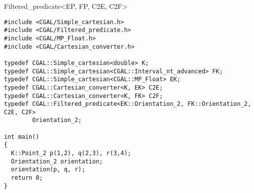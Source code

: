 \begin{ccRefClass}{Filtered_predicate<EP, FP, C2E, C2F>}
\begin{verbatim}
#include <CGAL/Simple_cartesian.h>
#include <CGAL/Filtered_predicate.h>
#include <CGAL/MP_Float.h>
#include <CGAL/Cartesian_converter.h>

typedef CGAL::Simple_cartesian<double> K;
typedef CGAL::Simple_cartesian<CGAL::Interval_nt_advanced> FK;
typedef CGAL::Simple_cartesian<CGAL::MP_Float> EK;
typedef CGAL::Cartesian_converter<K, EK> C2E;
typedef CGAL::Cartesian_converter<K, FK> C2F;
typedef CGAL::Filtered_predicate<EK::Orientation_2, FK::Orientation_2, C2E, C2F>
        Orientation_2;

int main()
{
  K::Point_2 p(1,2), q(2,3), r(3,4);
  Orientation_2 orientation;
  orientation(p, q, r);
  return 0;
}
\end{verbatim}

\end{ccRefClass}
